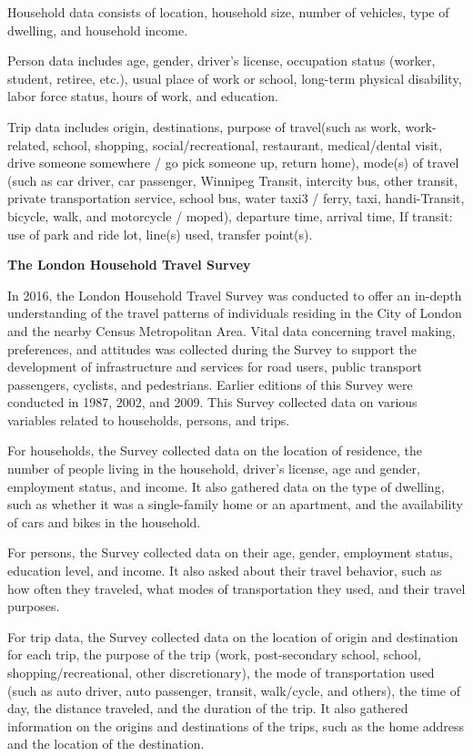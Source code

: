 \documentclass[12pt,twoside]{reedthesis}
\begin{document}
Household data consists of location, household size, number of vehicles, type of dwelling, and household income.

Person data includes age, gender, driver's license, occupation status (worker, student, retiree, etc.), usual place of work or school, long-term physical disability, labor force status, hours of work, and education.

Trip data includes origin, destinations, purpose of travel(such as work, work-related, school, shopping, social/recreational, restaurant, medical/dental visit, drive someone somewhere / go pick someone up, return home), mode(s) of travel (such as car driver, car passenger, Winnipeg Transit, intercity bus, other transit, private transportation service, school bus, water taxi3 / ferry, taxi, handi-Transit, bicycle, walk, and motorcycle / moped), departure time, arrival time, If transit: use of park and ride lot, line(s) used, transfer point(s).

\newpage

\textbf{The London Household Travel Survey}

In 2016, the London Household Travel Survey was conducted to offer an in-depth understanding of the travel patterns of individuals residing in the City of London and the nearby Census Metropolitan Area. Vital data concerning travel making, preferences, and attitudes was collected during the Survey to support the development of infrastructure and services for road users, public transport passengers, cyclists, and pedestrians. Earlier editions of this Survey were conducted in 1987, 2002, and 2009. This Survey collected data on various variables related to households, persons, and trips.

For households, the Survey collected data on the location of residence, the number of people living in the household, driver's license, age and gender, employment status, and income. It also gathered data on the type of dwelling, such as whether it was a single-family home or an apartment, and the availability of cars and bikes in the household.

For persons, the Survey collected data on their age, gender, employment status, education level, and income. It also asked about their travel behavior, such as how often they traveled, what modes of transportation they used, and their travel purposes.

For trip data, the Survey collected data on the location of origin and destination for each trip, the purpose of the trip (work, post-secondary school, school, shopping/recreational, other discretionary), the mode of transportation used (such as auto driver, auto passenger, transit, walk/cycle, and others), the time of day, the distance traveled, and the duration of the trip. It also gathered information on the origins and destinations of the trips, such as the home address and the location of the destination.
\end{document}
